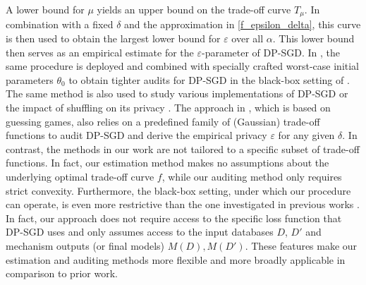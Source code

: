 A lower bound for $\mu$ yields an upper bound on the trade-off curve $T_{\mu}$. In combination with a fixed $\delta$ and the approximation in \eqref{f_epsilon_delta}, this curve is then used to obtain the largest lower bound for $\varepsilon$ over all $\alpha$. This lower bound then serves as an empirical estimate for the $\varepsilon$-parameter of DP-SGD. In \cite{Annamalai2024}, the same procedure is deployed and combined with specially crafted worst-case initial parameters $\theta_0$ to obtain tighter audits for DP-SGD in the black-box setting of \cite{Nasr2023}. The same method is also used to study various implementations of DP-SGD \cite{Annamalai2024_C} or the impact of shuffling on its privacy \cite{Annamalai2024_B}. The approach in \cite{Mahloujifar2024}, which is based on guessing games, also relies on a predefined family of (Gaussian) trade-off functions to audit DP-SGD and derive the empirical privacy $\varepsilon$ for any given $\delta$. In contrast, the methods in our work are not tailored to a specific subset of trade-off functions. In fact, our estimation method makes no assumptions about the underlying optimal trade-off curve $f$, while our auditing method only requires strict convexity. Furthermore, the black-box setting, under which our procedure can operate, is even more restrictive than the one investigated in previous works \cite{Nasr2023, Annamalai2024, Annamalai2024_C}. In fact, our approach does not require access to the specific loss function that DP-SGD uses and only assumes access to the input databases $D$, $D'$ and mechanism outputs (or final models) $M(D), M(D')$. These features make our estimation and auditing methods more flexible and more broadly applicable in comparison to prior work.



